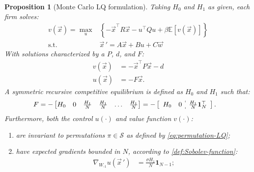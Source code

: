 \documentclass[12pt]{article}
\newtheorem{proposition}{Proposition}
\newcommand{\expec}[2][]{\ensuremath{\mathbb{E}_{{#1}}\left[ {#2} \right]}}
\begin{document}
\begin{proposition}[Monte Carlo LQ formulation]\label{prop:lin-quad}
Taking $H_0$ and $H_1$ as given, each firm solves:
\begin{align}
v(\vec{x})= \max_{u}&\left\{-\vec{x}^{\top}R \vec{x} - u^{\top}Q u+\beta \expec{v(\vec{x})}\right\}\label{eq:lin-quad-objective}\\
\text{s.t.} &   {\vec{x}\,'} = A \vec{x} + B u+ C \vec{w}\label{eq:lin-quad-lom}
\end{align}
With solutions characterized by a $P$, $d$, and $F$:
\begin{align}
v(\vec{x}) &= - \vec{x}^{\top} P \vec{x} - d\label{eq:v-LQ}\\
u(\vec{x}) &= - F \vec{x}.\label{eq:u-LQ-app}
\end{align}
A symmetric recursive competitive equilibrium is defined as $H_0$ and $H_1$ such that:
\begin{align}
F &=-\begin{bmatrix}
H_0 & 0 & \frac{H_1}{N} & \frac{H_1}{N} & \ldots & \frac{H_1}{N}
\end{bmatrix} = -\left[\begin{array}{cc;{5pt/2 pt}c} H_0 & 0 & \frac{H_1}{N}\mathbf{1}_N^{\top} \end{array}\right].\label{eq:H-F-equilibrium} 
\end{align}
Furthermore, both the control $u(\cdot)$ and value function $v(\cdot)$:
\begin{enumerate}
\item are invariant to permutations $\pi \in \mathcal{S}$ as defined by \cref{eq:permutation-LQ};
\item have expected gradients bounded in $N$, according to \cref{def:Sobolev-function}:
\begin{align}
\nabla_{{W_{\text{-}1}}} u(\vec{x}\,') &=  \frac{\sigma H_1}{N}\mathbf{1}_{N-1};\label{eq:prop-bounded-gradients}
\end{align}


\end{enumerate}
\end{proposition}
\end{document}
